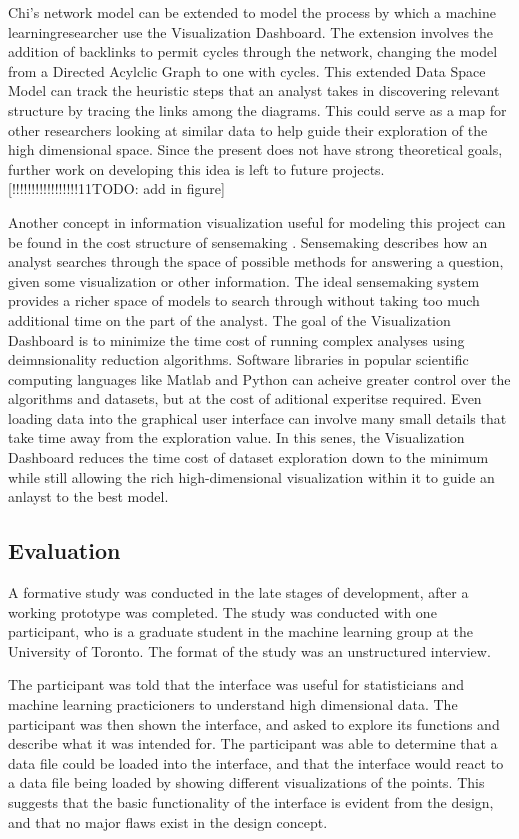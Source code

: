 \documentclass{sigchi}
\begin{document}
Chi's network model can be extended to model the process by which a machine learningresearcher use the Visualization Dashboard. The extension involves the addition of backlinks to permit cycles through the network, changing the model from a Directed Acylclic Graph to one with cycles. This extended Data Space Model can track the heuristic steps that an analyst takes in discovering relevant structure by tracing the links among the diagrams. This could serve as a map for other researchers looking at similar data to help guide their exploration of the high dimensional space. Since the present does not have strong theoretical goals, further work on developing this idea is left to future projects. [!!!!!!!!!!!!!!!!!11TODO: add in figure]

Another concept in information visualization useful for modeling this project can be found in the cost structure of sensemaking \cite{russel and card}. Sensemaking describes how an analyst searches through the space of possible methods for answering a question, given some visualization or other information. The ideal sensemaking system provides a richer space of models to search through without taking too much additional time on the part of the analyst. The goal of the Visualization Dashboard is to minimize the time cost of running complex analyses using deimnsionality reduction algorithms. Software libraries in popular scientific computing languages like Matlab and Python can acheive greater control over the algorithms and datasets, but at the cost of aditional experitse required. Even loading data into the graphical user interface can involve many small details that take time away from the exploration value. In this senes, the Visualization Dashboard reduces the time cost of dataset exploration down to the minimum while still allowing the rich high-dimensional visualization within it to guide an anlayst to the best model.



\subsection{Evaluation}
A formative study was conducted in the late stages of development, after a working prototype was completed. The study was conducted with one participant, who is a graduate student in the machine learning group at the University of Toronto. The format of the study was an unstructured interview.

The participant was told that the interface was useful for statisticians and machine learning practicioners to understand high dimensional data. The participant was then shown the interface, and asked to explore its functions and describe what it was intended for. The participant was able to determine that a data file could be loaded into the interface, and that the interface would react to a data file being loaded by showing different visualizations of the points. This suggests that the basic functionality of the interface is evident from the design, and that no major flaws exist in the design concept.
\end{document}
